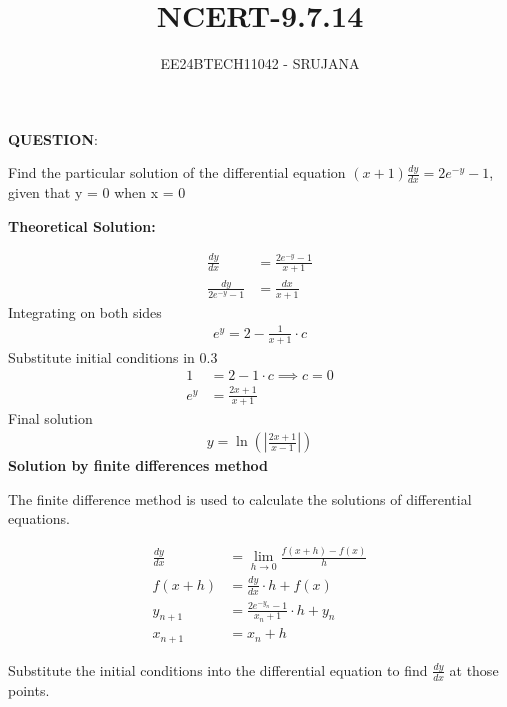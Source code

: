 \documentclass[journal]{IEEEtran}
\begin{document}

\vspace{3cm}

\title{NCERT-9.7.14}
\author{EE24BTECH11042 - SRUJANA}
{\let\newpage\relax\maketitle}

\renewcommand{\thefigure}{\theenumi}
\renewcommand{\thetable}{\theenumi}
\setlength{\intextsep}{10pt} 

\renewcommand{\thetable}{\theenumi}

\textbf{QUESTION}:

Find the particular solution of the differential equation $(x+1)\frac{dy}{dx} = 2 e^{-y}-1$, given that y = 0 when x = 0

\textbf{Theoretical Solution:}

\begin{align}
    \frac{dy}{dx} &= \frac{2 e^{-y}-1}{x+1}\\
    \frac{dy}{2 e^{-y}-1} &= \frac{dx}{x+1}
\end{align}
Integrating on both sides
\begin{align}
   e^y = 2-\frac{1}{x+1} \cdot c 
\end{align}
Substitute initial conditions in 0.3
\begin{align}
    1 &= 2-1 \cdot c \implies c=0\\
    e^y &= \frac{2x+1}{x+1}
\end{align}
Final solution 
\begin{align}
   y = \ln{\left( \left| \frac{2x+1}{x-1} \right| \right)}
\end{align}
\textbf{Solution by finite differences method}

The finite difference method is used to calculate the solutions of differential equations.

\begin{align}
    \frac{dy}{dx} &= \lim_{h \to 0}\frac{f(x+h)-f(x)}{h}\\
    f(x+h) &= \frac{dy}{dx} \cdot h + f(x)\\
    y_{n+1} &= \frac{2 e^{-y_n}-1}{x_n+1} \cdot h + y_n\\
    x_{n+1} &= x_n + h 
\end{align}

Substitute the initial conditions into the differential equation to find $\frac{dy}{dx}$ at those points. 
\end{document}
